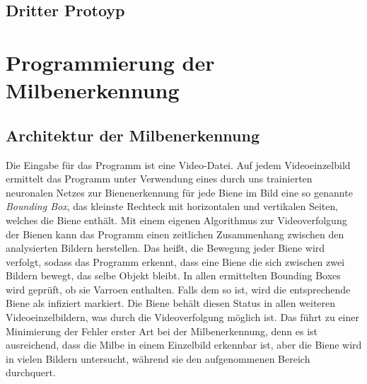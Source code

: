 \documentclass[11pt,a4paper]{article}
\begin{document}
\subsection{Dritter Protoyp}


\newpage
\section{Programmierung der Milbenerkennung} \label{section:Programmierung}
\subsection{Architektur der Milbenerkennung}
Die Eingabe für das Programm ist eine Video-Datei. Auf jedem Videoeinzelbild ermittelt das Programm unter Verwendung eines durch uns trainierten neuronalen Netzes zur Bienenerkennung für jede Biene im Bild eine so genannte \textit{Bounding Box}, das kleinste Rechteck mit horizontalen und vertikalen Seiten, welches die Biene enthält. Mit einem eigenen Algorithmus zur Videoverfolgung der Bienen kann das Programm einen zeitlichen Zusammenhang zwischen den analysierten Bildern herstellen. Das heißt, die Bewegung jeder Biene wird verfolgt, sodass das Programm erkennt, dass eine Biene die sich zwischen zwei Bildern bewegt, das selbe Objekt bleibt. In allen ermittelten Bounding Boxes wird geprüft, ob sie Varroen enthalten. Falls dem so ist, wird die entsprechende Biene als infiziert markiert. Die Biene behält diesen Status in allen weiteren Videoeinzelbildern, was durch die Videoverfolgung möglich ist. Das führt zu einer Minimierung der Fehler erster Art bei der Milbenerkennung, denn es ist ausreichend, dass die Milbe in einem Einzelbild erkennbar ist, aber die Biene wird in vielen Bildern untersucht, während sie den aufgenommenen Bereich durchquert.
\end{document}
